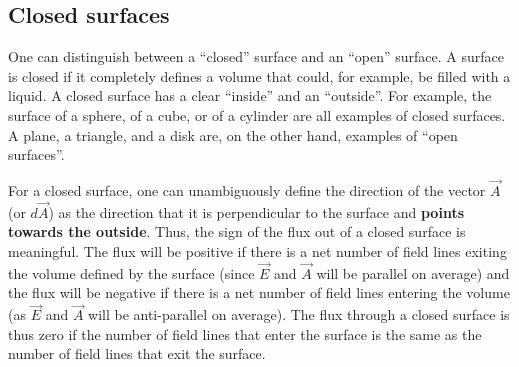 \subsection{Closed surfaces}
\label{sec:gauss:closedsurfaces}
One can distinguish between a ``closed'' surface and an ``open'' surface. A surface is closed if it completely defines a volume that could, for example, be filled with a liquid.  A closed surface has a clear ``inside'' and an ``outside''. For example, the surface of a sphere, of a cube, or of a cylinder are all examples of closed surfaces. A plane, a triangle, and a disk are, on the other hand, examples of ``open surfaces''.

For a closed surface, one can unambiguously define the direction of the vector $\vec A$ (or $d\vec A$) as the direction that it is perpendicular to the surface and \textbf{points towards the outside}. Thus, the sign of the flux out of a closed surface is meaningful. The flux will be positive if there is a net number of field lines exiting the volume defined by the surface (since $\vec E$ and $\vec A$ will be parallel on average) and the flux will be negative if there is a net number of field lines entering the volume (as $\vec E$ and $\vec A$ will be anti-parallel on average). The flux through a closed surface is thus zero if the number of field lines that enter the surface is the same as the number of field lines that exit the surface.

